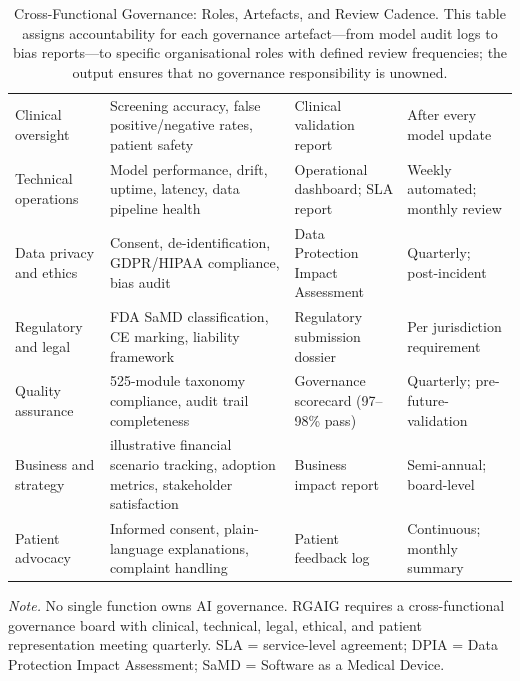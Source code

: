 \begin{table}[H]
\tablestripes
\caption[Cross-Functional Governance: Roles, Artefacts, and]{Cross-Functional Governance: Roles, Artefacts, and Review Cadence. This table assigns accountability for each governance artefact---from model audit logs to bias reports---to specific organisational roles with defined review frequencies; the output ensures that no governance responsibility is unowned.}
\tablefontsize
\begin{tabularx}{\textwidth}{@{} p{1.8cm} L L p{2.0cm} @{}}
\toprule
{} &  &  &  \\
\midrule
Clinical oversight & Screening accuracy, false positive/negative rates, patient safety & Clinical validation report & After every model update \\
\addlinespace
Technical operations & Model performance, drift, uptime, latency, data pipeline health & Operational dashboard; SLA report & Weekly automated; monthly review \\
\addlinespace
Data privacy and ethics & Consent, de-identification, GDPR/HIPAA compliance, bias audit & Data Protection Impact Assessment & Quarterly; post-incident \\
\addlinespace
Regulatory and legal & FDA SaMD classification, CE marking, liability framework & Regulatory submission dossier & Per jurisdiction requirement \\
\addlinespace
Quality assurance & 525-module taxonomy compliance, audit trail completeness & Governance scorecard (97--98\% pass) & Quarterly; pre-future-validation \\
\addlinespace
Business and strategy & illustrative financial scenario tracking, adoption metrics, stakeholder satisfaction & Business impact report & Semi-annual; board-level \\
\addlinespace
Patient advocacy & Informed consent, plain-language explanations, complaint handling & Patient feedback log & Continuous; monthly summary \\
\bottomrule
\end{tabularx}
\vspace{0.5em}\noindent\textit{Note.} No single function owns AI governance. RGAIG requires a cross-functional governance board with clinical, technical, legal, ethical, and patient representation meeting quarterly. SLA = service-level agreement; DPIA = Data Protection Impact Assessment; SaMD = Software as a Medical Device.
\end{table}

